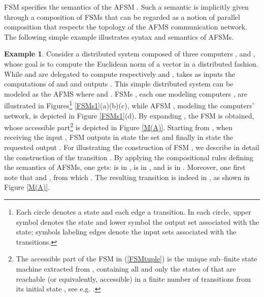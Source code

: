 \documentclass{amsart}
\theoremstyle{definition}
\newtheorem{example}[theorem]{Example}
\theoremstyle{remark}
\numberwithin{equation}{section}
\begin{document}
FSM  specifies the semantics of the AFSM . Such a semantic is implicitly given through a composition of FSMs that can be regarded as a notion of parallel composition \cite{ModelChecking} that respects the topology of the AFMS communication network. 
The following simple example illustrates syntax and semantics of AFSMs.
\begin{example}
\label{exex}
Consider a distributed system composed of three computers ,  and , whose goal is to compute the Euclidean norm  of a vector  in a distributed fashion. 
While  and  are delegated to compute respectively  and ,  takes as inputs the computations of  and  and outputs . 
This simple distributed system can be modeled as the AFMS  where  and 
. 
FSMs , each one modeling computers , are illustrated in Figures\footnote{Each circle denotes a state and each edge a transition. In each circle, upper symbol denotes the state and lower symbol the output set associated with the state; symbols labeling edges denote the input sets associated with the transitions.} \ref{FSMs1}(a)(b)(c), while AFSM , modeling the computers' network, is depicted in Figure \ref{FSMs1}(d). 
By expanding , the FSM  is obtained, whose accessible part\footnote{The accessible part of the FSM  in (\ref{FSMtuple}) is the unique sub--finite state machine extracted from , containing all and only the states of  that are reachable (or equivalently, accessible) in a finite number of transitions from its initial state , see e.g. \cite{cassandras}.} 
is depicted in Figure \ref{M(A)}. Starting from , when receiving the input , FSM  outputs in state  the set  and finally in state  the requested output . For illustrating the construction of FSM , we describe in detail the construction of the transition . By applying the compositional rules defining the semantics of AFSMs, one gets: 
 is in ,  is in , and  is in . Moreover, one first note that  and , from which . 
The resulting transition  is indeed in , as shown in Figure \ref{M(A)}. 
\end{example}
\end{document}
